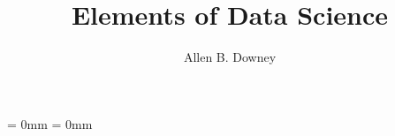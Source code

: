 \newcommand{\thetitle}{Elements of Data Science}
\newcommand{\thesubtitle}{}
\newcommand{\theauthors}{Allen B. Downey}
\newcommand{\theversion}{1.0.0}

\title{\thetitle}
\author{\theauthors}

\usepackage[T1]{fontenc}
\usepackage[utf8]{inputenc}
\usepackage{textcomp} %
\usepackage{amssymb,amsmath}
\usepackage[table]{xcolor}

\usepackage{roboto}







\usepackage{setspace}
\usepackage{graphicx}


\makeatletter
{}
\makeatother


\usepackage{bookmark}


\makeatletter
\def\fps@figure{h!}
\makeatother


\usepackage{makeidx}
\usepackage{upquote}
\usepackage[listings]{tcolorbox}
\newcommand{\passthrough}[1]{#1}


\usepackage{booktabs}
\usepackage{longtable}
\usepackage{calc}             %


\renewcommand{\toprule}{}
\renewcommand{\bottomrule}{}

\newcommand{\midsepremove}{\aboverulesep = 0mm
                           \belowrulesep = 0mm}
\midsepremove


